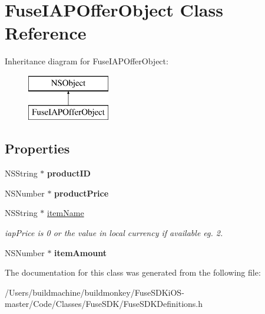 \hypertarget{interface_fuse_i_a_p_offer_object}{}\section{Fuse\+I\+A\+P\+Offer\+Object Class Reference}
\label{interface_fuse_i_a_p_offer_object}
Inheritance diagram for Fuse\+I\+A\+P\+Offer\+Object\+:\begin{figure}[H]
\begin{center}
\leavevmode
\includegraphics[height=2.000000cm]{interface_fuse_i_a_p_offer_object}
\end{center}
\end{figure}
\subsection*{Properties}
\begin{DoxyCompactItemize}
\item 
\hypertarget{interface_fuse_i_a_p_offer_object_a571e791fe7952e6d533affcd141cf8d3}{}N\+S\+String $\ast$ {\bfseries product\+I\+D}\label{interface_fuse_i_a_p_offer_object_a571e791fe7952e6d533affcd141cf8d3}

\item 
\hypertarget{interface_fuse_i_a_p_offer_object_a8d1ea52ddcdc454acacd66c011a43341}{}N\+S\+Number $\ast$ {\bfseries product\+Price}\label{interface_fuse_i_a_p_offer_object_a8d1ea52ddcdc454acacd66c011a43341}

\item 
\hypertarget{interface_fuse_i_a_p_offer_object_afc44eae0ea1010ef7b02515dfc156e68}{}N\+S\+String $\ast$ \hyperlink{interface_fuse_i_a_p_offer_object_afc44eae0ea1010ef7b02515dfc156e68}{item\+Name}\label{interface_fuse_i_a_p_offer_object_afc44eae0ea1010ef7b02515dfc156e68}

\begin{DoxyCompactList}\small\item\em iap\+Price is 0 or the value in local currency if available eg. 2. \end{DoxyCompactList}\item 
\hypertarget{interface_fuse_i_a_p_offer_object_a3eb537b8ee870de5085c035c1de25a31}{}N\+S\+Number $\ast$ {\bfseries item\+Amount}\label{interface_fuse_i_a_p_offer_object_a3eb537b8ee870de5085c035c1de25a31}

\end{DoxyCompactItemize}


The documentation for this class was generated from the following file\+:\begin{DoxyCompactItemize}
\item 
/\+Users/buildmachine/buildmonkey/\+Fuse\+S\+D\+Ki\+O\+S-\/master/\+Code/\+Classes/\+Fuse\+S\+D\+K/Fuse\+S\+D\+K\+Definitions.\+h\end{DoxyCompactItemize}
